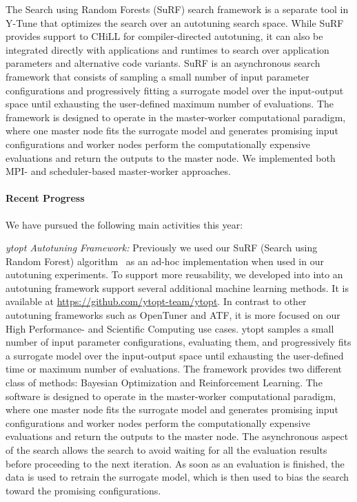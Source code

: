 The Search using Random Forests (SuRF) search framework is a separate tool in Y-Tune that optimizes the search over an autotuning search space.  While
SuRF provides support to CHiLL for compiler-directed autotuning, it can
also be integrated directly with applications and runtimes to search over
application parameters and alternative code variants.
SuRF is an asynchronous search framework that consists of sampling a small number of input parameter configurations and progressively fitting a surrogate model over the input-output space until exhausting the user-defined maximum number of evaluations. The framework is designed to operate in the master-worker computational paradigm, where one master node fits the surrogate model and generates promising input configurations and worker nodes perform the computationally expensive evaluations and return the outputs to the master node. We implemented both MPI- and scheduler-based master-worker approaches.


\paragraph{Recent Progress}


We have pursued the following main activities this year:


\textit{ytopt Autotuning Framework:}
Previously we used our SuRF (Search using Random Forest) algorithm~\cite{nelson2015surf} as an ad-hoc implementation when used in our autotuning experiments. To support more reusability, we developed into into an autotuning framework support several additional machine learning methods. It is available at \url{https://github.com/ytopt-team/ytopt}. In contrast to other autotuning frameworks such as OpenTuner and ATF, it is more focused on our High Performance- and Scientific Computing use cases. 
ytopt samples a small number of input parameter configurations, evaluating them, and progressively fits a surrogate model over the input-output space until exhausting the user-defined time or maximum number of evaluations.
The framework provides two different class of methods: Bayesian Optimization and Reinforcement Learning. The software is designed to operate in the master-worker computational paradigm, where one master node fits the surrogate model and generates promising input configurations and worker nodes perform the computationally expensive evaluations and return the outputs to the master node. The asynchronous aspect of the search allows the search to avoid waiting for all the evaluation results before proceeding to the next iteration. As soon as an evaluation is finished, the data is used to retrain the surrogate model, which is then used to bias the search toward the promising configurations.


